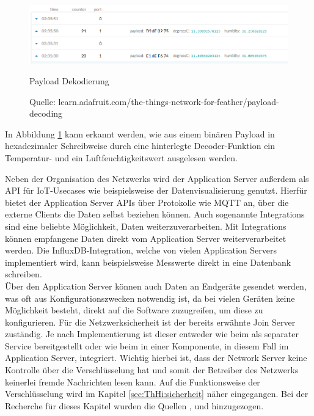 \begin{figure}[H]
  \vspace{10pt}
  \begin{center}
    \includegraphics[width=1.0\textwidth]{./images/payload-decoding.png}
  \end{center}
  \vspace{-5pt}
  \caption[Payload Dekodierung]{Payload Dekodierung}
  \caption*{Quelle: {learn.adafruit.com/the-things-network-for-feather/payload-decoding}}
  \label{fig:payload-decoding}
  \vspace{-10pt}
\end{figure}

In Abbildung \ref{fig:payload-decoding} kann erkannt werden, wie aus einem binären Payload in hexadezimaler Schreibweise durch eine hinterlegte Decoder-Funktion ein Temperatur- und ein Luftfeuchtigkeitswert ausgelesen werden.

Neben der Organisation des Netzwerks wird der Application Server außerdem als API für IoT-Usecases wie beispielsweise der Datenvisualisierung genutzt. Hierfür bietet der Application Server APIs über Protokolle wie MQTT an, über die externe Clients die Daten selbst beziehen können. Auch sogenannte Integrations sind eine beliebte Möglichkeit, Daten weiterzuverarbeiten. Mit Integrations können empfangene Daten direkt vom Application Server weiterverarbeitet werden. Die InfluxDB-Integration, welche von vielen Application Servers implementiert wird, kann beispielsweise Messwerte direkt in eine Datenbank schreiben. \\
Über den Application Server können auch Daten an Endgeräte gesendet werden, was oft aus Konfigurations\-zwecken notwendig ist, da bei vielen Geräten keine Möglichkeit besteht, direkt auf die Software zuzugreifen, um diese zu konfigurieren.
Für die Netzwerksicherheit ist der bereits erwähnte Join Server zuständig. Je nach Implementierung ist dieser entweder wie beim  als separater Service bereitgestellt oder wie beim  in einer Komponente, in diesem Fall im Application Server, integriert. Wichtig hierbei ist, dass der Network Server keine Kontrolle über die Verschlüsselung hat und somit der Betreiber des Netzwerks keinerlei fremde Nachrichten lesen kann. Auf die Funktionsweise der Verschlüsselung wird im Kapitel \ref{sec:ThHi:sicherheit} näher eingegangen. Bei der Recherche für dieses Kapitel wurden die Quellen \cite{TTNArch.2020}, \cite{ChirpArch.2020} und \cite{TTSApp.2020} hinzugezogen.


